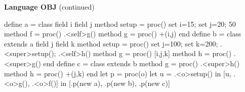 \begin{minipage}[t]{\sw}
\slidenumber
\LARGE
{\bf Language OBJ} (continued)
\large
\begin{qv}
define a = class
    field i field j
    method setup = proc() {set i=15; set j=20; 50}
    method f = proc() .<self>g()
    method g = proc() +(i,j)
  end
define b = class extends a
    field j field k
    method setup =
      proc() {set j=100; set k=200; .<super>setup(); .<self>h()}
    method g = proc() [i,j,k]
    method h = proc() .<super>g()
  end
define c = class extends b
    method g = proc() .<super>h()
    method h = proc() +(j,k)
  end
let
   p = proc(o)
     let
       u = .<o>setup()
     in
       [u, .<o>g(), .<o>f()]
in 
  [.p(new a), .p(new b), .p(new c)]

\end{qv}
\end{minipage}

